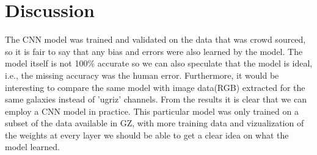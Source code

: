 \section{Discussion}
\label{sec:dis}
The CNN model was trained and validated on the data that was crowd sourced, so it is fair to say that any bias and errors were also learned by the model. The model itself is not 100\% accurate so we can also speculate that the model is ideal, i.e., the missing accuracy was the human error. Furthermore, it would be interesting to compare the same model with image data(RGB) extracted for the same galaxies instead of 'ugriz' channels. From the results it is clear that we can employ a CNN model in practice. This particular model was only trained on a subset of the data available in GZ, with more training data and vizualization of the weights at every layer we should be able to get a clear idea on what the model learned.